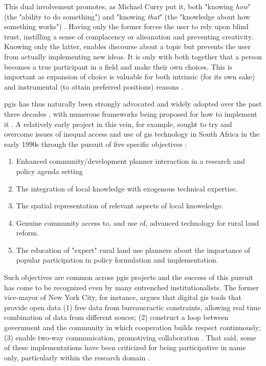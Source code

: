 This dual involvement promotes, as Michael Curry put it, both "knowing \textit{how}" (the "ability to do something") and "knowing \textit{that}" (the "knowledge about how something works") \cite{curryGeographicalInformationSystems1994}. Having only the former forces the user to rely upon blind trust, instilling a sense of complacency or alieanation and preventing creativity. Knowing only the latter, enables discourse about a topic but prevents the user from actually implementing new ideas. It is only with both together that a person becomes a true participant in a field and make their own choices. This is important as expansion of choice is valuable for both intrinsic (for its own sake) and instrumental (to attain preferred positions) reasons \cite{senFreedomChoiceConcept1988}.

\ac{pgis} has thus naturally been strongly advocated and widely adopted over the past three decades \cite{drummondFutureGISPlanning2008}, with numerous frameworks being proposed for how to implement it \cite{brommelstroetPlanningSupportSystems2010}. A relatively early project in this vein, for example, sought to try and overcome issues of inequal access and use of \ac{gis} technology in South Africa in the early 1990s through the pursuit of five specific objectives \cite{harrisPursuingSocialGoals1994}: 

\begin{enumerate}[itemsep=0pt,parsep=0pt]
	\item{Enhanced community/development planner interaction in a research and policy agenda setting}
	\item{The integration of local knowledge with exogenous technical expertise.}
	\item{The spatial representation of relevant aspects of local knoweledge.}
	\item{Genuine community access to, and use of, advanced technology for rural land reform.}
	\item{The education of "expert" rural land use planners about the importance of popular participation in policy formulation and implementation.}
\end{enumerate}

Such objectives are common across \ac{pgis} projects and the success of this pursuit has come to be recognized even by many entrenched institutionalists. The former vice-mayor of New York City, for instance, argues that digital \ac{gis} tools that provide open data (1) free data from bureaucractic constraints, allowing real time combination of data from different souces; (2) construct a loop between government and the community in which cooperation builds respect continuously; (3) enable two-way communication, promotiving collaboration \cite{goldsmithResponsiveCityEngaging2014}. That said, some of these implementations have been criticized for being participative in name only, particularly within the research domain \cite{tebrommelstroetRelevanceResearchPlanning2009}.

